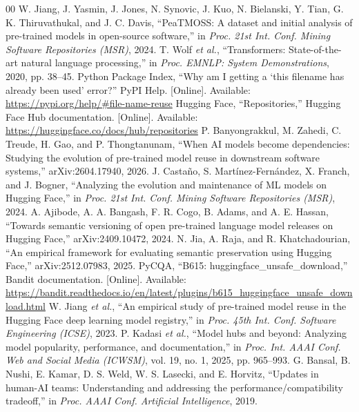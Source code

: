 \documentclass[conference]{IEEEtran}
\begin{document}
\begin{thebibliography}{00}
 W. Jiang, J. Yasmin, J. Jones, N. Synovic, J. Kuo, N. Bielanski, Y. Tian, G. K. Thiruvathukal, and J. C. Davis, ``PeaTMOSS: A dataset and initial analysis of pre-trained models in open-source software,'' in \textit{Proc. 21st Int. Conf. Mining Software Repositories (MSR)}, 2024.
 T. Wolf \textit{et al.}, ``Transformers: State-of-the-art natural language processing,'' in \textit{Proc. EMNLP: System Demonstrations}, 2020, pp. 38--45.
 Python Package Index, ``Why am I getting a `this filename has already been used' error?'' PyPI Help. [Online]. Available: \url{https://pypi.org/help/#file-name-reuse}
 Hugging Face, ``Repositories,'' Hugging Face Hub documentation. [Online]. Available: \url{https://huggingface.co/docs/hub/repositories}
 P. Banyongrakkul, M. Zahedi, C. Treude, H. Gao, and P. Thongtanunam, ``When AI models become dependencies: Studying the evolution of pre-trained model reuse in downstream software systems,'' arXiv:2604.17940, 2026.
 J. Castaño, S. Martínez-Fernández, X. Franch, and J. Bogner, ``Analyzing the evolution and maintenance of ML models on Hugging Face,'' in \textit{Proc. 21st Int. Conf. Mining Software Repositories (MSR)}, 2024.
 A. Ajibode, A. A. Bangash, F. R. Cogo, B. Adams, and A. E. Hassan, ``Towards semantic versioning of open pre-trained language model releases on Hugging Face,'' arXiv:2409.10472, 2024.
 N. Jia, A. Raja, and R. Khatchadourian, ``An empirical framework for evaluating semantic preservation using Hugging Face,'' arXiv:2512.07983, 2025.
 PyCQA, ``B615: huggingface\_unsafe\_download,'' Bandit documentation. [Online]. Available: \url{https://bandit.readthedocs.io/en/latest/plugins/b615_huggingface_unsafe_download.html}
 W. Jiang \textit{et al.}, ``An empirical study of pre-trained model reuse in the Hugging Face deep learning model registry,'' in \textit{Proc. 45th Int. Conf. Software Engineering (ICSE)}, 2023.
 P. Kadasi \textit{et al.}, ``Model hubs and beyond: Analyzing model popularity, performance, and documentation,'' in \textit{Proc. Int. AAAI Conf. Web and Social Media (ICWSM)}, vol. 19, no. 1, 2025, pp. 965--993.
 G. Bansal, B. Nushi, E. Kamar, D. S. Weld, W. S. Lasecki, and E. Horvitz, ``Updates in human-AI teams: Understanding and addressing the performance/compatibility tradeoff,'' in \textit{Proc. AAAI Conf. Artificial Intelligence}, 2019.

\end{thebibliography}
\end{document}
